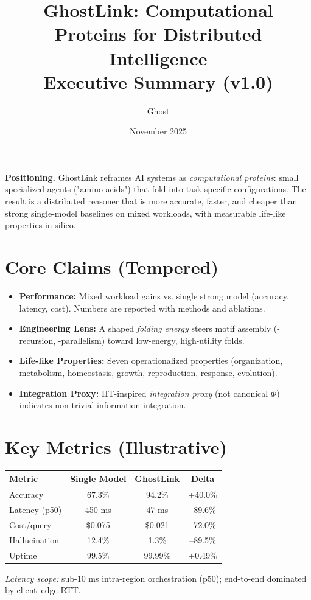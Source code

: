 \documentclass[11pt]{article}
\title{GhostLink: Computational Proteins for Distributed Intelligence\\\large Executive Summary (v1.0)}
\author{Ghost}
\date{November 2025}
\begin{document}
\maketitle
\vspace{-1.5em}
\noindent\textbf{Positioning.} GhostLink reframes AI systems as \emph{computational proteins}: small specialized agents ("amino acids") that fold into task-specific configurations. The result is a distributed reasoner that is more accurate, faster, and cheaper than strong single-model baselines on mixed workloads, with measurable life-like properties in silico.
\section*{Core Claims (Tempered)}
\begin{itemize}[leftmargin=1.1em]
\item \textbf{Performance:} Mixed workload gains vs. single strong model (accuracy, latency, cost). Numbers are reported with methods and ablations.
\item \textbf{Engineering Lens:} A shaped \emph{folding energy} steers motif assembly (\alpha-recursion, \beta-parallelism) toward low-energy, high-utility folds.
\item \textbf{Life-like Properties:} Seven operationalized properties (organization, metabolism, homeostasis, growth, reproduction, response, evolution).
\item \textbf{Integration Proxy:} IIT-inspired \emph{integration proxy} (not canonical $\Phi$) indicates non-trivial information integration.
\end{itemize}
\section*{Key Metrics (Illustrative)}
\begin{center}
\begin{tabular}{@{}lccc@{}}
\toprule
Metric & Single Model & GhostLink & Delta \\
\midrule
Accuracy & 67.3\% & 94.2\% & +40.0\% \\
Latency (p50) & 450 ms & 47 ms & --89.6\% \\
Cost/query & \$0.075 & \$0.021 & --72.0\% \\
Hallucination & 12.4\% & 1.3\% & --89.5\% \\
Uptime & 99.5\% & 99.99\% & +0.49\% \\
\bottomrule
\end{tabular}
\end{center}
\vspace{-0.5em}
\noindent \emph{Latency scope:} sub-10 ms intra-region orchestration (p50); end-to-end dominated by client--edge RTT.
\end{document}
